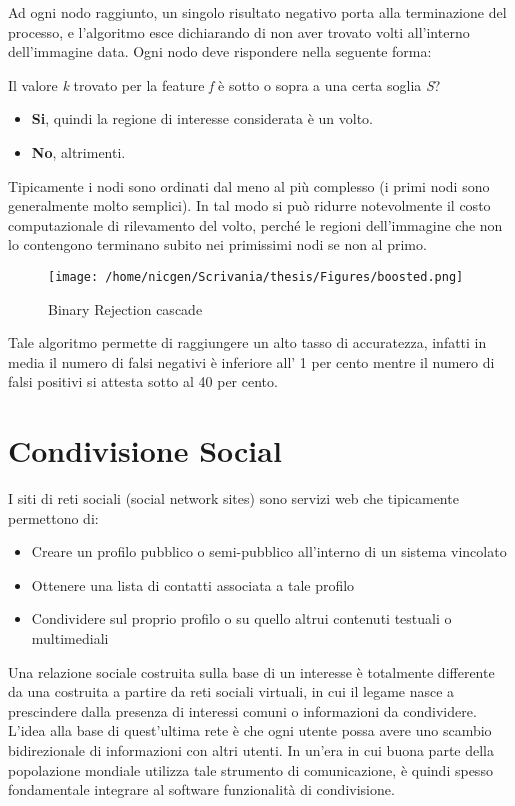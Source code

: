 Ad ogni nodo raggiunto, un singolo risultato negativo porta alla terminazione del processo, e l'algoritmo esce dichiarando di non aver trovato volti all'interno dell'immagine data. Ogni nodo deve rispondere nella seguente forma: 

Il valore \textit{k} trovato per la feature \textit{f} è sotto o sopra a una certa soglia \textit{S}? 
\begin{itemize}
\item \textbf{Si}, quindi la regione di interesse considerata è un volto.
\item \textbf{No}, altrimenti.
\end{itemize}

Tipicamente i nodi sono ordinati dal meno al più complesso (i primi nodi sono generalmente molto semplici). In tal modo si può ridurre notevolmente il costo computazionale di rilevamento del volto, perché le regioni dell'immagine che non lo contengono terminano subito nei primissimi nodi se non al primo.

\begin{figure}[H]\centering  
\texttt{[image: /home/nicgen/Scrivania/thesis/Figures/boosted.png]}
\caption[Binary Rejection cascade]{Binary Rejection cascade}
\label{pic-a}
\end{figure}

Tale algoritmo permette di raggiungere un alto tasso di accuratezza, infatti in media il numero di falsi negativi è inferiore all' 1 per cento mentre il numero di falsi positivi si attesta sotto al 40 per cento.

\section{Condivisione Social}

I siti di reti sociali (social network sites) sono servizi web che tipicamente permettono di:
\begin{itemize}
\item Creare un profilo pubblico o semi-pubblico all'interno di un sistema vincolato
\item Ottenere una lista di contatti associata a tale profilo
\item Condividere sul proprio profilo o su quello altrui contenuti testuali o multimediali
\end{itemize}

Una relazione sociale costruita sulla base di un interesse è totalmente differente da una costruita a partire da reti sociali virtuali, in cui il legame nasce a prescindere dalla presenza di interessi comuni o informazioni da condividere.
L'idea alla base di quest'ultima rete è che ogni utente possa avere uno scambio bidirezionale di informazioni con altri utenti. In un'era in cui buona parte della popolazione mondiale utilizza tale strumento di comunicazione, è quindi spesso fondamentale integrare al software funzionalità di condivisione.

